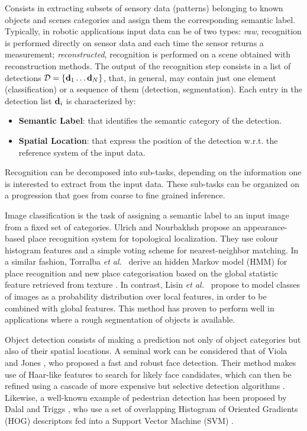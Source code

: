 \documentclass[letterpaper, 10 pt, conference]{ieeeconf}  %
\newcommand\etal{\emph{et al.}}
\begin{document}
Consists in extracting subsets of sensory data (patterns) belonging to known objects and scenes categories and assign them the corresponding semantic label. Typically, in robotic applications input data can be of two types: \emph{raw}, recognition is performed directly on sensor data and each time the sensor returns a measurement; \emph{reconstructed}, recognition is performed on a scene obtained with reconstruction methods. The output of the recognition step consists in a list of detections $\mathcal{D} = \{ \mathbf{d}_1 \dots \mathbf{d}_N \}$, that, in general, may contain just one element (classification) or a sequence of them (detection, segmentation). Each entry in the detection list $\mathbf{d}_i$ is characterized by: 
\begin{itemize}
	\item {\bf Semantic Label}: that identifies the semantic category of the detection. 
	\item {\bf Spatial Location}: that express the position of the detection w.r.t. the reference system of the input data.
\end{itemize}

Recognition can be decomposed into sub-tasks, depending on the information one is interested to extract from the input data. These sub-tasks can be organized on a progression that goes from coarse to fine grained inference.

Image classification is the task of assigning a semantic label to an input image from a fixed set of categories. Ulrich and Nourbakhsh \cite{ulrich2000icra} propose an appearance-based place recognition system for topological localization. They use colour histogram features \cite{swain1991ijcv} and a simple voting scheme for nearest-neighbor matching. In a similar fashion, Torralba \etal~\cite{torralba2003context} derive an hidden Markov model (HMM) for place recognition and new place categorisation based on the global statistic feature retrieved from texture \cite{oliva2001ijcv}. In contrast, Lisin \etal~\cite{lisin2005cvpr} propose to model classes of images as a probability distribution over local features, in order to be combined with global features. This method has proven to perform well in applications where a rough segmentation of objects is available.

Object detection consists of making a prediction not only of object categories but also of their spatial locations. A seminal work can be considered that of Viola and Jones \cite{viola2004ijcv}, who proposed a fast and robust face detection. Their method makes use of Haar-like features \cite{papageorgiou1998iccv} to search for likely face candidates, which can then be refined using a cascade of more expensive but selective detection algorithms \cite{freund1997jcss}. Likewise, a well-known example of pedestrian detection has been proposed by Dalal and Triggs \cite{dalal2005cvpr}, who use a set of overlapping Histogram of Oriented Gradients (HOG) descriptors fed into a Support Vector Machine (SVM) \cite{cortes1995support}.
\end{document}
